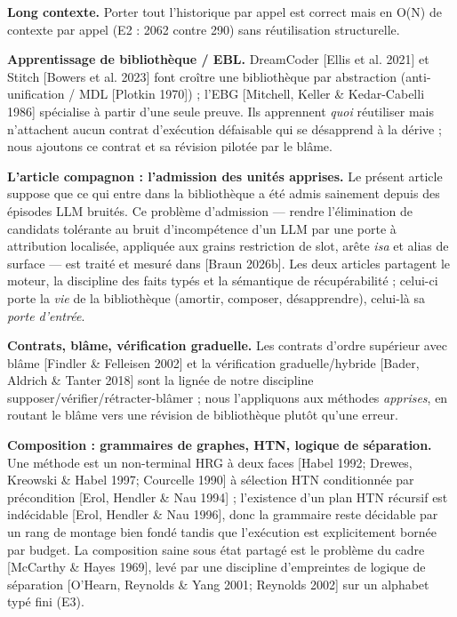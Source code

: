 \documentclass[11pt]{article}
\begin{document}
\textbf{Long contexte.} Porter tout l'historique par appel est correct mais en O(N) de contexte par appel (E2 : 2062 contre 290) sans réutilisation structurelle.

\textbf{Apprentissage de bibliothèque / EBL.} DreamCoder [Ellis et al. 2021] et Stitch [Bowers et al. 2023] font croître une bibliothèque par abstraction (anti-unification / MDL [Plotkin 1970]) ; l'EBG [Mitchell, Keller \& Kedar-Cabelli 1986] spécialise à partir d'une seule preuve. Ils apprennent \emph{quoi} réutiliser mais n'attachent aucun contrat d'exécution défaisable qui se désapprend à la dérive ; nous ajoutons ce contrat et sa révision pilotée par le blâme.

\textbf{L'article compagnon : l'admission des unités apprises.} Le présent article suppose que ce qui entre dans la bibliothèque a été admis sainement depuis des épisodes LLM bruités. Ce problème d'admission — rendre l'élimination de candidats tolérante au bruit d'incompétence d'un LLM par une porte à attribution localisée, appliquée aux grains restriction de slot, arête \emph{isa} et alias de surface — est traité et mesuré dans [Braun 2026b]. Les deux articles partagent le moteur, la discipline des faits typés et la sémantique de récupérabilité ; celui-ci porte la \emph{vie} de la bibliothèque (amortir, composer, désapprendre), celui-là sa \emph{porte d'entrée}.

\textbf{Contrats, blâme, vérification graduelle.} Les contrats d'ordre supérieur avec blâme [Findler \& Felleisen 2002] et la vérification graduelle/hybride [Bader, Aldrich \& Tanter 2018] sont la lignée de notre discipline supposer/vérifier/rétracter-blâmer ; nous l'appliquons aux méthodes \emph{apprises}, en routant le blâme vers une révision de bibliothèque plutôt qu'une erreur.

\textbf{Composition : grammaires de graphes, HTN, logique de séparation.} Une méthode est un non-terminal HRG à deux faces [Habel 1992; Drewes, Kreowski \& Habel 1997; Courcelle 1990] à sélection HTN conditionnée par précondition [Erol, Hendler \& Nau 1994] ; l'existence d'un plan HTN récursif est indécidable [Erol, Hendler \& Nau 1996], donc la grammaire reste décidable par un rang de montage bien fondé tandis que l'exécution est explicitement bornée par budget. La composition saine sous état partagé est le problème du cadre [McCarthy \& Hayes 1969], levé par une discipline d'empreintes de logique de séparation [O'Hearn, Reynolds \& Yang 2001; Reynolds 2002] sur un alphabet typé fini (E3).
\end{document}
